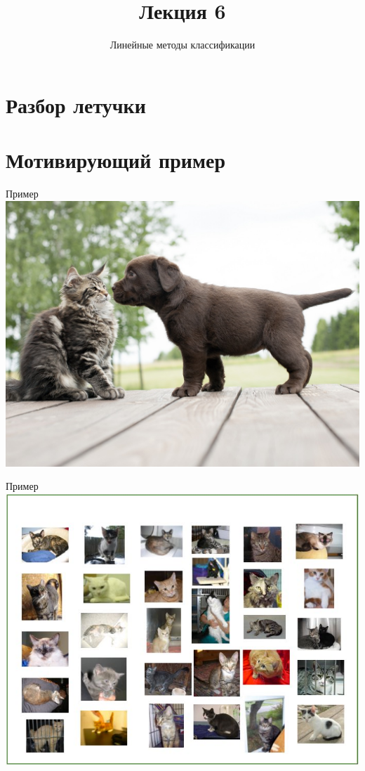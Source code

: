 \documentclass[10pt]{beamer}
\title{Лекция 6}
\subtitle{Линейные методы классификации}
\begin{document}
\section{Разбор летучки}

\maketitle

\section{Мотивирующий пример}

{
\begin{frame}{Пример}
  \centering
  \includegraphics[width=0.9 \textwidth, keepaspectratio]{images/catvsdog}
\end{frame}
}

{
\begin{frame}{Пример}
  \centering
  \includegraphics[width=0.9 \textwidth, keepaspectratio]{images/cats}
\end{frame}
}
\end{document}
